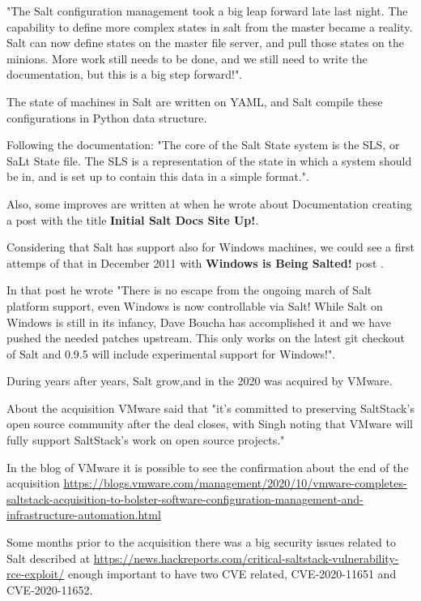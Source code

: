 \documentclass[12pt,a4paper,openright,twoside]{book}
\begin{document}
"The Salt configuration management took a big leap forward late last night. The capability to define more complex states in salt from the master became a reality. Salt can now define states on the master file server, and pull those states on the minions. More work still needs to be done, and we still need to write the documentation, but this is a big step forward!".


The state of machines in Salt are written on YAML, and Salt compile these configurations in Python data structure.


Following the documentation: "The core of the Salt State system is the SLS, or SaLt State file. The SLS is a representation of the state in which a system should be in, and is set up to contain this data in a simple format."\cite{saltDocSLS}.

Also, some improves are written at when he wrote about Documentation creating a post with the title \textbf{Initial Salt Docs Site Up!}.\cite{saltPost}


Considering that Salt has support also for Windows machines, we could see a first attemps of that in December 2011 with \textbf{Windows is Being Salted!} post \cite{saltPost2}.


In that post he wrote "There is no escape from the ongoing march of Salt platform support, even Windows is now controllable via Salt! While Salt on Windows is still in its infancy, Dave Boucha has accomplished it and we have pushed the needed patches upstream. This only works on the latest git checkout of Salt and 0.9.5 will include experimental support for Windows!"\cite{saltPost2}.

During years after years, Salt grow,and in the 2020 was acquired by VMware.


About the acquisition VMware said that "it's committed to preserving SaltStack's open source community after the deal closes, with Singh noting that VMware will fully support SaltStack's work on open source projects."\cite{saltAcq}


In the blog of VMware it is possible to see the confirmation about the end of the acquisition
\url{https://blogs.vmware.com/management/2020/10/vmware-completes-saltstack-acquisition-to-bolster-software-configuration-management-and-infrastructure-automation.html}

Some months prior to the acquisition there was a big security issues related to Salt described at \url{https://news.hackreports.com/critical-saltstack-vulnerability-rce-exploit/} enough important to have two CVE related, CVE-2020-11651 and CVE-2020-11652.
\end{document}
